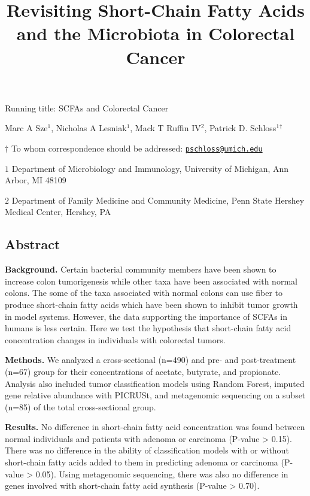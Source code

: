 \documentclass[11pt,]{article}
\title{Revisiting Short-Chain Fatty Acids and the Microbiota in Colorectal
Cancer}
\author{}
\date{}
\begin{document}
\maketitle

\vspace{35mm}

Running title: SCFAs and Colorectal Cancer

\vspace{35mm}

Marc A Sze\({^1}\), Nicholas A Lesniak\({^1}\), Mack T Ruffin
IV\({^2}\), Patrick D. Schloss\({^1}\)\({^\dagger}\)

\vspace{40mm}

\(\dagger\) To whom correspondence should be addressed:
\href{mailto:pschloss@umich.edu}{\nolinkurl{pschloss@umich.edu}}

\(1\) Department of Microbiology and Immunology, University of Michigan,
Ann Arbor, MI 48109

\(2\) Department of Family Medicine and Community Medicine, Penn State
Hershey Medical Center, Hershey, PA

\newpage

\linenumbers

\subsection{Abstract}\label{abstract}

\textbf{Background.} Certain bacterial community members have been shown
to increase colon tumorigenesis while other taxa have been associated
with normal colons. The some of the taxa associated with normal colons
can use fiber to produce short-chain fatty acids which have been shown
to inhibit tumor growth in model systems. However, the data supporting
the importance of SCFAs in humans is less certain. Here we test the
hypothesis that short-chain fatty acid concentration changes in
individuals with colorectal tumors.

\textbf{Methods.} We analyzed a cross-sectional (n=490) and pre- and
post-treatment (n=67) group for their concentrations of acetate,
butyrate, and propionate. Analysis also included tumor classification
models using Random Forest, imputed gene relative abundance with
PICRUSt, and metagenomic sequencing on a subset (n=85) of the total
cross-sectional group.

\textbf{Results.} No difference in short-chain fatty acid concentration
was found between normal individuals and patients with adenoma or
carcinoma (P-value \textgreater{} 0.15). There was no difference in the
ability of classification models with or without short-chain fatty acids
added to them in predicting adenoma or carcinoma (P-value \textgreater{}
0.05). Using metagenomic sequencing, there was also no difference in
genes involved with short-chain fatty acid synthesis (P-value
\textgreater{} 0.70).
\end{document}

